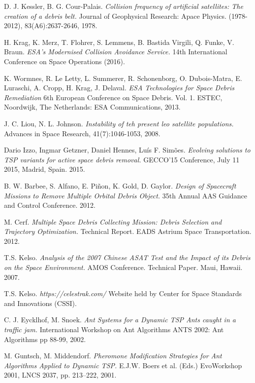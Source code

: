 \documentclass[a4paper,9pt,journal,twoside,compsoc]{PPIEEEtran}
\begin{document}
\begin{thebibliography}{9}
D. J. Kessler, B. G. Cour-Palais.
\textit{Collision frequency of artificial satellites: The creation of a debris belt.}
Journal of Geophysical Research: Apace Physics. (1978-2012), 83(A6):2637-2646, 1978.

H. Krag, K. Merz, T. Flohrer, S. Lemmens, B. Bastida Virgili, Q. Funke, V. Braun.
\textit{ESA’s Modernised Collision Avoidance Service.}
14th International Conference on Space Operations (2016).

K. Wormnes, R. Le Letty, L. Summerer, R. Schonenborg, O. Dubois-Matra, E. Luraschi, A. Cropp, H. Krag, J. Delaval.
\textit{ESA Technologies for Space Debris Remediation}
6th European Conference on Space Debris. Vol. 1. ESTEC, Noordwijk, The Netherlands: ESA Communications, 2013.

J. C. Liou, N. L. Johnson.
\textit{Instability of teh present leo satellite populations.}
Advances in Space Research, 41(7):1046-1053, 2008.

Dario Izzo, Ingmar Getzner, Daniel Hennes, Luís F. Simões.
\textit{Evolving solutions to TSP variants for active space debris
removal.}
GECCO'15 Conference, July 11 2015, Madrid, Spain. 2015.

B. W. Barbee, S. Alfano, E. Piñon, K. Gold, D. Gaylor.
\textit{Design of Spacecraft Missions to Remove Multiple Orbital Debris Object.}
35th Annual AAS Guidance and Control Conference. 2012.

M. Cerf.
\textit{Multiple Space Debris Collecting Mission: Debris Selection and Trajectory Optimization.}
Technical Report. EADS Astrium Space Transportation. 2012.

T.S. Kelso.
\textit{Analysis of the 2007 Chinese ASAT Test and the Impact of its Debris on the Space Environment.}
AMOS Conference. Technical Paper. Maui, Hawaii. 2007.

T.S. Kelso.
\textit{https://celestrak.com/}
Website held by Center for Space Standards and Innovations (CSSI).

C. J. Eycklhof, M. Snoek.
\textit{Ant Systems for a Dynamic TSP Ants caught in a traffic jam.}
International Workshop on Ant Algorithms ANTS 2002: Ant Algorithms pp 88-99, 2002.

M. Guntsch, M. Middendorf.
\textit{Pheromone Modification Strategies for Ant Algorithms Applied to Dynamic TSP.}
E.J.W. Boers et al. (Eds.) EvoWorkshop 2001, LNCS 2037, pp. 213–222, 2001.


\end{thebibliography}
\end{document}
